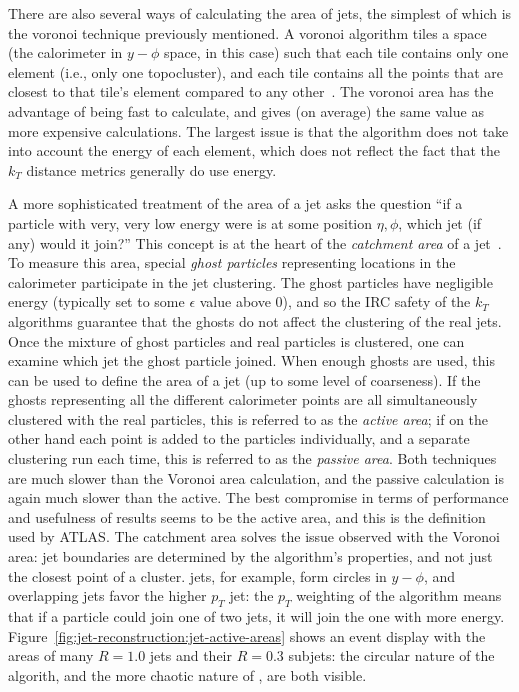 There are also several ways of calculating the area of jets, the simplest of which is the voronoi technique previously mentioned. A voronoi algorithm tiles a space (the calorimeter in $y-\phi$ space, in this case) such that each tile contains only one element (i.e., only one topocluster), and each tile contains all the points that are closest to that tile's element compared to any other~\cite{catchmentarea}. The voronoi area has the advantage of being fast to calculate, and gives (on average) the same value as more expensive calculations. The largest issue is that the algorithm does not take into account the energy of each element, which does not reflect the fact that the $k_T$ distance metrics generally do use energy.

A more sophisticated treatment of the area of a jet asks the question ``if a particle with very, very low energy were is at some position $\eta,\phi$, which jet (if any) would it join?'' This concept is at the heart of the \textit{catchment area} of a jet~\cite{catchmentarea}. To measure this area, special \textit{ghost particles} representing locations in the calorimeter participate in the jet clustering. The ghost particles have negligible energy (typically set to some $\epsilon$ value above 0), and so the IRC safety of the $k_T$ algorithms guarantee that the ghosts do not affect the clustering of the real jets. Once the mixture of ghost particles and real particles is clustered, one can examine which jet the ghost particle joined. When enough ghosts are used, this can be used to define the area of a jet (up to some level of coarseness). If the ghosts representing all the different calorimeter points are all simultaneously clustered with the real particles, this is referred to as the \textit{active area}; if on the other hand each point is added to the particles individually, and a separate clustering run each time, this is referred to as the \textit{passive area}. Both techniques are much slower than the Voronoi area calculation, and the passive calculation is again much slower than the active. The best compromise in terms of performance and usefulness of results seems to be the active area, and this is the definition used by ATLAS. The catchment area solves the issue observed with the Voronoi area: jet boundaries are determined by the algorithm's properties, and not just the closest point of a cluster. \Antikt jets, for example, form circles in $y-\phi$, and overlapping jets favor the higher $p_T$ jet: the $p_T$ weighting of the algorithm means that if a particle could join one of two jets, it will join the one with more energy. Figure~\ref{fig:jet-reconstruction:jet-active-areas} shows an event display with the areas of many \antikt $R=1.0$ jets and their \kt $R=0.3$ subjets: the circular nature of the \antikt algorith, and the more chaotic nature of \kt, are both visible.

